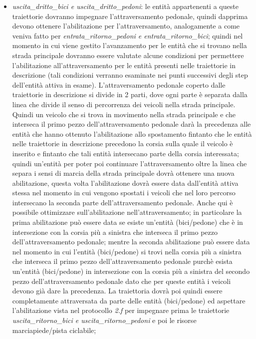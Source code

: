 \begin{enumerate}
\begin{enumerate}
\begin{itemize}
\item \textit{usci\-ta\_drit\-to\_bi\-ci e usci\-ta\_drit\-to\_pe\-do\-ni}: le
entità appartenenti a queste traiettorie dovranno impegnare l'attraversamento pedonale, quindi dapprima devono ottenere l'abilitazione per l'attraversamento, analogamente a come veniva fatto per \textit{en\-tra\-ta\_ri\-tor\-no\_pe\-do\-ni e en\-tra\-ta\_ri\-tor\-no\_bi\-ci}; quindi nel momento in cui viene gestito l'avanzamento per le entità che si trovano nella strada principale dovranno essere valutate alcune condizioni per permettere l'abilitazione all'attraversamento per le entità presenti nelle traiettorie in descrizione (tali condizioni verranno esaminate nei punti successivi degli step dell'entità attiva in esame). L'attraversamento pedonale coperto dalle traiettorie in descrizione si divide in 2 parti, dove ogni parte è separata dalla linea che divide il senso di percorrenza dei veicoli nella strada principale. Quindi un veicolo che si trova in movimento nella strada principale e che interseca il primo pezzo dell'attraversamento pedonale darà la precedenza alle entità che hanno ottenuto l'abilitazione allo spostamento fintanto che le entità nelle traiettorie in descrizione precedono la corsia sulla quale il veicolo è inserito e fintanto che tali entità intersecano parte della corsia interessata; quindi un'entità per poter poi continuare l'attraversamento oltre la linea che separa i sensi di marcia della strada principale dovrà ottenere una nuova abilitazione, questa volta l'abilitazione dovrà essere data dall'entità attiva stessa nel momento in cui vengono spostati i veicoli che nel loro percorso intersecano la seconda parte dell'attraversamento pedonale. Anche qui è possibile ottimizzare sull'abilitazione nell'attraversamento; in particolare la prima abilitazione può essere data se esiste un'entità (bici/pedone) che è in intersezione con la corsia più a sinistra che interseca il primo pezzo dell'attraversamento pedonale; mentre la seconda abilitazione può essere data nel momento in cui l'entità (bici/pedone) si trovi nella corsia più a sinistra che interseca il primo pezzo dell'attraversamento pedonale purchè esista un'entità (bici/pedone) in intersezione con la corsia più a sinistra del secondo pezzo dell'attraversamento pedonale dato che per queste entità i veicoli devono già dare la precedenza. La traiettoria dovrà poi quindi essere completamente attraversata da parte delle entità (bici/pedone) ed aspettare l'abilitazione vista nel protocollo \textit{2.f} per impegnare prima le traiettorie \textit{usci\-ta\_ri\-tor\-no\_bi\-ci e usci\-ta\_ri\-tor\-no\_pe\-do\-ni} e poi le risorse marciapiede/pista ciclabile;

\end{itemize}
\end{enumerate}
\end{enumerate}
